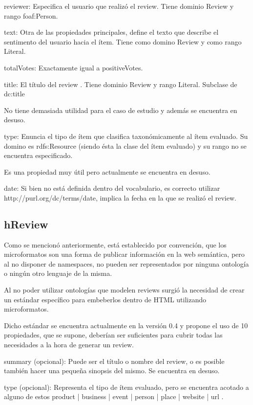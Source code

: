 reviewer: Especifica el usuario que realizó el review. Tiene dominio Review y rango foaf:Person. 



text: Otra de las propiedades principales, define el texto que describe el sentimento del usuario hacia el ítem. Tiene como 
domino Review y como rango Literal.


totalVotes: Exactamente igual a positiveVotes.


title: El título del review . Tiene dominio Review y rango Literal. Subclase de dc:title


No tiene demasiada utilidad para el caso de estudio y además se encuentra en desuso.


type: Enuncia el tipo de ítem que clasifica taxonómicamente al ítem evaluado. Su domino es rdfs:Resource (siendo ésta la clase del ítem evaluado)  
y su rango no se encuentra especificado. 


Es una propiedad muy útil pero actualmente se encuentra en desuso.


date: Si bien no está definida dentro del vocabulario, es correcto utilizar http://purl.org/dc/terms/date, implica la fecha en la 
que se realizó el review.


\subsection{hReview}

Como se mencionó anteriormente, está establecido por convención, que los microformatos son una forma de publicar información en la 
web semántica, pero al no disponer de namespaces, no pueden ser representados por ninguna ontología o ningún otro lenguaje de la misma. 


Al no poder utilizar ontologías que modelen reviews surgió la necesidad de crear un estándar específico para embeberlos dentro de HTML 
utilizando microformatos.

Dicho estándar se encuentra actualmente en la versión 0.4 y propone el uso de 10 propiedades, que se supone, deberían ser 
suficientes para cubrir todas las necesidades a la hora de generar un review.

summary (opcional): Puede ser el título o nombre del review, o es posible también hacer una pequeña sinopsis del mismo. Se encuentra en desuso.

type (opcional): Representa el tipo de ítem evaluado, pero se encuentra acotado a alguno de estos  product | business | event | person | place | website | url .


